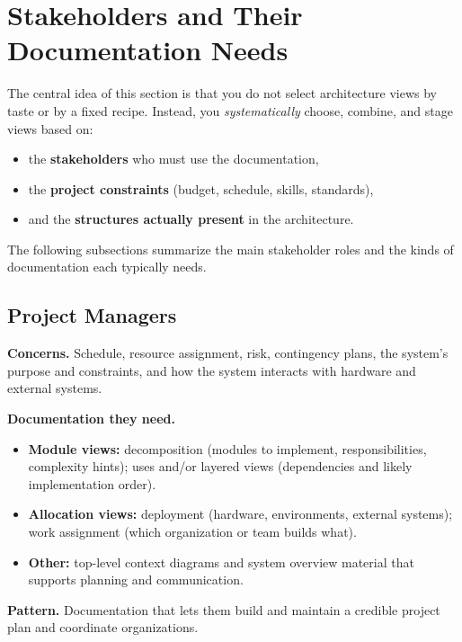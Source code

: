 \documentclass[11pt]{article}
\begin{document}
\section{Stakeholders and Their Documentation Needs}

The central idea of this section is that you do not select architecture views by taste or by a fixed recipe.
Instead, you \emph{systematically} choose, combine, and stage views based on:

\begin{itemize}[noitemsep]
  \item the \textbf{stakeholders} who must use the documentation,
  \item the \textbf{project constraints} (budget, schedule, skills, standards),
  \item and the \textbf{structures actually present} in the architecture.
\end{itemize}

The following subsections summarize the main stakeholder roles and the kinds of documentation each typically needs.

\subsection{Project Managers}

\textbf{Concerns.} Schedule, resource assignment, risk, contingency plans, the system's purpose and constraints, and how the system interacts with hardware and external systems.

\medskip
\noindent
\textbf{Documentation they need.}
\begin{itemize}[noitemsep]
  \item \textbf{Module views:} decomposition (modules to implement, responsibilities, complexity hints); uses and/or layered views (dependencies and likely implementation order).
  \item \textbf{Allocation views:} deployment (hardware, environments, external systems); work assignment (which organization or team builds what).
  \item \textbf{Other:} top-level context diagrams and system overview material that supports planning and communication.
\end{itemize}

\noindent
\textbf{Pattern.} Documentation that lets them build and maintain a credible project plan and coordinate organizations.
\end{document}

